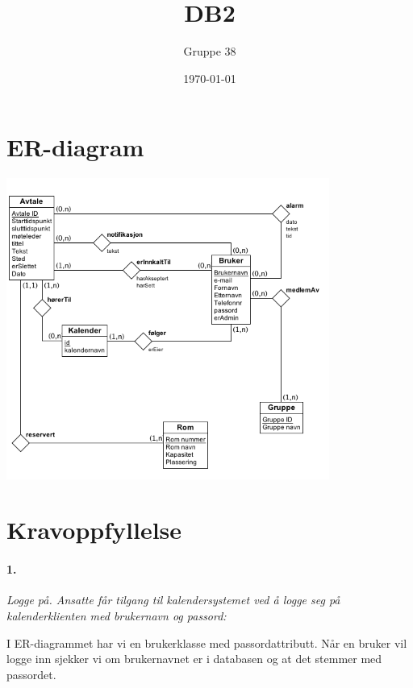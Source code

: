 \documentclass[titlepage]{article}
\author{Gruppe 38}
\title{DB2}
\date{\today}
\begin{document}
\maketitle

\tableofcontents

\newpage


\section{ER-diagram}
\includegraphics[width=400px]{er-diagram.png}

\newpage

\section{Kravoppfyllelse}
\paragraph{1.}\textit{ Logge på. Ansatte får tilgang til kalendersystemet ved å logge seg på kalenderklienten med brukernavn og passord:}

I ER-diagrammet har vi en brukerklasse med passordattributt. Når en bruker vil logge inn sjekker vi om brukernavnet er i databasen og at det stemmer med passordet.
\end{document}
